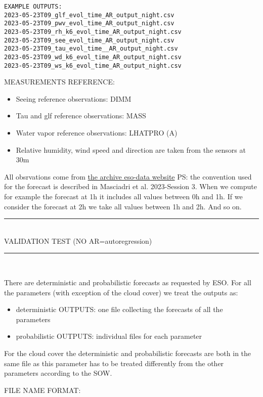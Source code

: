 \documentclass[11pt,english]{article}
\newcommand{\HRule}{\rule{\linewidth}{0.5mm}}
\begin{document}
\begin{verbatim}
EXAMPLE OUTPUTS:
2023-05-23T09_glf_evol_time_AR_output_night.csv
2023-05-23T09_pwv_evol_time_AR_output_night.csv
2023-05-23T09_rh_k6_evol_time_AR_output_night.csv
2023-05-23T09_see_evol_time_AR_output_night.csv
2023-05-23T09_tau_evol_time__AR_output_night.csv
2023-05-23T09_wd_k6_evol_time_AR_output_night.csv
2023-05-23T09_ws_k6_evol_time_AR_output_night.csv
\end{verbatim}
MEASUREMENTS REFERENCE:
\begin{itemize}
\item Seeing reference observations: DIMM
\item Tau and glf reference observations: MASS
\item Water vapor reference observations: LHATPRO (A)
\item Relative humidity, wind speed and direction are taken from the sensors at 30m
\end{itemize}
All obsrvations come from \href{http://archive.eso.org/cms/eso-data/ambient-conditions/paranal-ambient-query-forms.html}{the archive eso-data website}
%
PS: the convention used for the forecast is described in Masciadri et al. 2023-Session 3. When we compute for example the forecast at 1h it includes all values between 0h and 1h. If we consider the forecast at 2h we take all values between 1h and 2h. And so on.
%

\begin{center}
\HRule \\[0.4cm]
VALIDATION TEST (NO AR=autoregression)
\HRule \\[0.4cm]
\end{center}

There are deterministic and probabilistic forecasts as requested by ESO. For all the parameters (with exception of the cloud cover) we treat the outputs as:
\begin{itemize}
\item deterministic OUTPUTS: one file collecting the forecasts of all the parameters 
\item probabilistic OUTPUTS: individual files for each parameter 
\end{itemize}

For the cloud cover the deterministic and probabilistic forecasts are both in the same file as this parameter has to be treated differently from the other parameters according to the SOW.

FILE NAME FORMAT:
\end{document}

